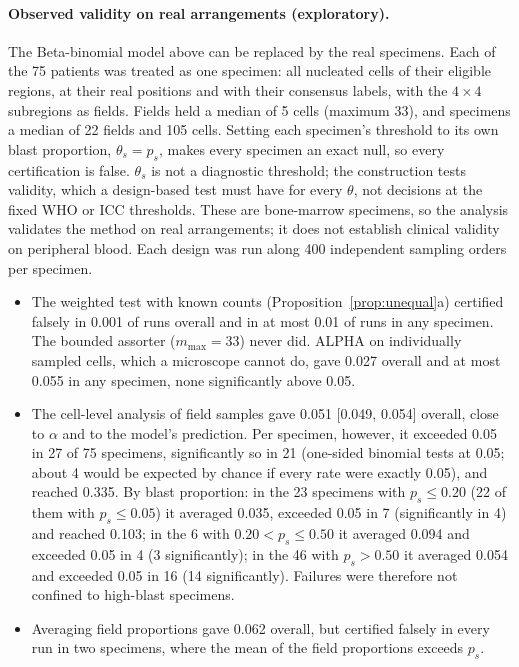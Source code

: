 \documentclass[11pt]{article}
\theoremstyle{remark}
\theoremstyle{definition}
\begin{document}
\paragraph{Observed validity on real arrangements (exploratory).} The Beta-binomial model above can be replaced by the real specimens. Each of the 75 patients was treated as one specimen: all nucleated cells of their eligible regions, at their real positions and with their consensus labels, with the $4\times4$ subregions as fields. Fields held a median of 5 cells (maximum 33), and specimens a median of 22 fields and 105 cells. Setting each specimen's threshold to its own blast proportion, $\theta_s=p_s$, makes every specimen an exact null, so every certification is false. $\theta_s$ is not a diagnostic threshold; the construction tests validity, which a design-based test must have for every $\theta$, not decisions at the fixed WHO or ICC thresholds. These are bone-marrow specimens, so the analysis validates the method on real arrangements; it does not establish clinical validity on peripheral blood. Each design was run along 400 independent sampling orders per specimen.
\begin{itemize}
\item The weighted test with known counts (Proposition~\ref{prop:unequal}a) certified falsely in 0.001 of runs overall and in at most 0.01 of runs in any specimen. The bounded assorter ($m_{\max}=33$) never did. ALPHA on individually sampled cells, which a microscope cannot do, gave 0.027 overall and at most 0.055 in any specimen, none significantly above 0.05.
\item The cell-level analysis of field samples gave 0.051 [0.049, 0.054] overall, close to $\alpha$ and to the model's prediction. Per specimen, however, it exceeded 0.05 in 27 of 75 specimens, significantly so in 21 (one-sided binomial tests at 0.05; about 4 would be expected by chance if every rate were exactly 0.05), and reached 0.335. By blast proportion: in the 23 specimens with $p_s\le0.20$ (22 of them with $p_s\le0.05$) it averaged 0.035, exceeded 0.05 in 7 (significantly in 4) and reached 0.103; in the 6 with $0.20<p_s\le0.50$ it averaged 0.094 and exceeded 0.05 in 4 (3 significantly); in the 46 with $p_s>0.50$ it averaged 0.054 and exceeded 0.05 in 16 (14 significantly). Failures were therefore not confined to high-blast specimens.
\item Averaging field proportions gave 0.062 overall, but certified falsely in every run in two specimens, where the mean of the field proportions exceeds $p_s$.
\end{itemize}
\end{document}
